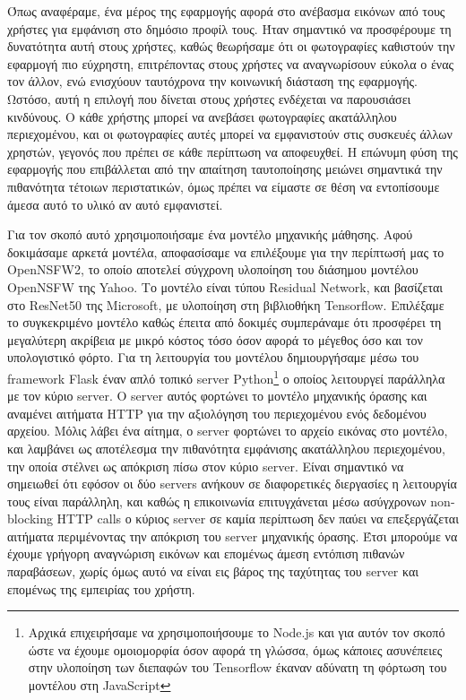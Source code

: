 \documentclass[../thesis.tex]{subfiles}
\begin{document}
Όπως αναφέραμε, ένα μέρος της εφαρμογής αφορά στο ανέβασμα εικόνων από τους χρήστες για εμφάνιση στο δημόσιο προφίλ τους.
Ήταν σημαντικό να προσφέρουμε τη δυνατότητα αυτή στους χρήστες, καθώς θεωρήσαμε ότι οι φωτογραφίες καθιστούν την εφαρμογή πιο εύχρηστη, επιτρέποντας στους χρήστες να αναγνωρίσουν εύκολα ο ένας τον άλλον, ενώ ενισχύουν ταυτόχρονα την κοινωνική διάσταση της εφαρμογής.
Ωστόσο, αυτή η επιλογή που δίνεται στους χρήστες ενδέχεται να παρουσιάσει κινδύνους.
Ο κάθε χρήστης μπορεί να ανεβάσει φωτογραφίες ακατάλληλου περιεχομένου, και οι φωτογραφίες αυτές μπορεί να εμφανιστούν στις συσκευές άλλων χρηστών, γεγονός που πρέπει σε κάθε περίπτωση να αποφευχθεί.
Η επώνυμη φύση της εφαρμογής που επιβάλλεται από την απαίτηση ταυτοποίησης μειώνει σημαντικά την πιθανότητα τέτοιων περιστατικών, όμως πρέπει να είμαστε σε θέση να εντοπίσουμε άμεσα αυτό το υλικό αν αυτό εμφανιστεί.

Για τον σκοπό αυτό χρησιμοποιήσαμε ένα μοντέλο μηχανικής μάθησης.
Αφού δοκιμάσαμε αρκετά μοντέλα, αποφασίσαμε να επιλέξουμε για την περίπτωσή μας το OpenNSFW2\cite{Yung_Open-NSFW_2_2023}, το οποίο αποτελεί σύγχρονη υλοποίηση του διάσημου μοντέλου OpenNSFW\cite{Mahadeokar_Pesavento_2016} της Yahoo.
Το μοντέλο είναι τύπου Residual Network, και βασίζεται στο ResNet50 της Microsoft, με υλοποίηση στη βιβλιοθήκη Tensorflow.
Επιλέξαμε το συγκεκριμένο μοντέλο καθώς έπειτα από δοκιμές συμπεράναμε ότι προσφέρει τη μεγαλύτερη ακρίβεια με μικρό κόστος τόσο όσον αφορά το μέγεθος όσο και τον υπολογιστικό φόρτο.
Για τη λειτουργία του μοντέλου δημιουργήσαμε μέσω του framework Flask έναν απλό τοπικό server Python\footnote{Αρχικά επιχειρήσαμε να χρησιμοποιήσουμε το Node.js και για αυτόν τον σκοπό ώστε να έχουμε ομοιομορφία όσον αφορά τη γλώσσα, όμως κάποιες ασυνέπειες στην υλοποίηση των διεπαφών του Tensorflow έκαναν αδύνατη τη φόρτωση του μοντέλου στη JavaScript} ο οποίος λειτουργεί παράλληλα με τον κύριο server.
Ο server αυτός φορτώνει το μοντέλο μηχανικής όρασης και αναμένει αιτήματα HTTP για την αξιολόγηση του περιεχομένου ενός δεδομένου αρχείου.
Μόλις λάβει ένα αίτημα, ο server φορτώνει το αρχείο εικόνας στο μοντέλο, και λαμβάνει ως αποτέλεσμα την πιθανότητα εμφάνισης ακατάλληλου περιεχομένου, την οποία στέλνει ως απόκριση πίσω στον κύριο server.
Είναι σημαντικό να σημειωθεί ότι εφόσον οι δύο servers ανήκουν σε διαφορετικές διεργασίες η λειτουργία τους είναι παράλληλη, και καθώς η επικοινωνία επιτυγχάνεται μέσω ασύγχρονων non-blocking HTTP calls ο κύριος server σε καμία περίπτωση δεν παύει να επεξεργάζεται αιτήματα περιμένοντας την απόκριση του server μηχανικής όρασης.
Έτσι μπορούμε να έχουμε γρήγορη αναγνώριση εικόνων και επομένως άμεση εντόπιση πιθανών παραβάσεων, χωρίς όμως αυτό να είναι εις βάρος της ταχύτητας του server και επομένως της εμπειρίας του χρήστη.
\end{document}
